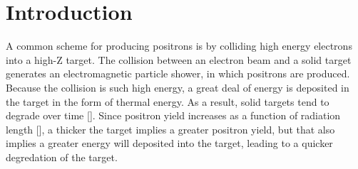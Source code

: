 \documentclass[%
reprint,
amsmath, amssymb,
aps,
floatfix,
]{revtex4-2}
\begin{document}
    

\section{Introduction}
A common scheme for producing positrons is by colliding high energy electrons into a high-Z target.
The collision between an electron beam and a solid target generates an electromagnetic particle shower,
in which positrons are produced.
Because the collision is such high energy, a great deal of energy is deposited in the target in the form of
thermal energy.  As a result, solid targets tend to degrade over time [].  Since positron yield increases as a
function of radiation length [], a thicker the target implies a greater positron yield, but that also implies
a greater energy will deposited into the target, leading to a quicker degredation of the target.
\end{document}
